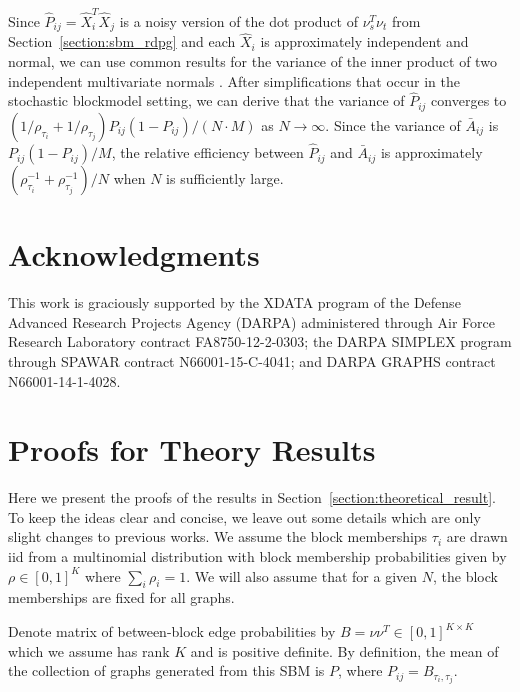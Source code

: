 \documentclass[10pt,letterpaper]{article}
\renewcommand{\hat}{\widehat}
\begin{document}
Since $\hat{P}_{ij} = \hat{X}_i^T \hat{X}_j$ is a noisy version of the dot product of $\nu_s^T \nu_t$ from Section~\ref{section:sbm_rdpg} and each $\hat{X}_i$ is approximately independent and normal, we can use common results for the variance of the inner product of two independent multivariate normals \citep{brown1977means}.
After simplifications that occur in the stochastic blockmodel setting, we can derive that the variance of $\hat{P}_{ij}$ converges to $\left( 1/\rho_{\tau_i} + 1/\rho_{\tau_j} \right) P_{ij} (1-P_{ij})/(N \cdot M)$ as $N \rightarrow \infty$. 
Since the variance of $\bar{A}_{ij}$ is $P_{ij} (1-P_{ij})/M$, the relative efficiency between $\hat{P}_{ij}$ and $\bar{A}_{ij}$ is approximately $(\rho_{\tau_i}^{-1} + \rho_{\tau_j}^{-1})/N$ when $N$ is sufficiently large.
    

\section*{Acknowledgments}

This work is graciously supported by the XDATA program of the Defense
Advanced Research Projects Agency (DARPA) administered through Air
Force Research Laboratory contract FA8750-12-2-0303; the DARPA SIMPLEX
program through SPAWAR contract N66001-15-C-4041; and DARPA GRAPHS
contract N66001-14-1-4028.

\nolinenumbers






\appendix

\section{Proofs for Theory Results}
Here we present the proofs of the results in Section~\ref{section:theoretical_result}. To keep the ideas clear and concise, we leave out some details which are only slight changes to previous works.
We assume the block memberships $\tau_i$ are drawn iid from a multinomial distribution with block membership probabilities given by $\rho\in[0,1]^K$ where $\sum_i \rho_i =1$.
We will also assume that for a given $N$, the block memberships are fixed for all graphs.

Denote matrix of between-block edge probabilities by $B = \nu \nu^T\in[0,1]^{K\times K}$ which we assume has rank $K$ and is positive definite. 
By definition, the mean of the collection of graphs generated from this SBM is $P$, where $P_{ij} = B_{\tau_i, \tau_j}$. 
\end{document}
